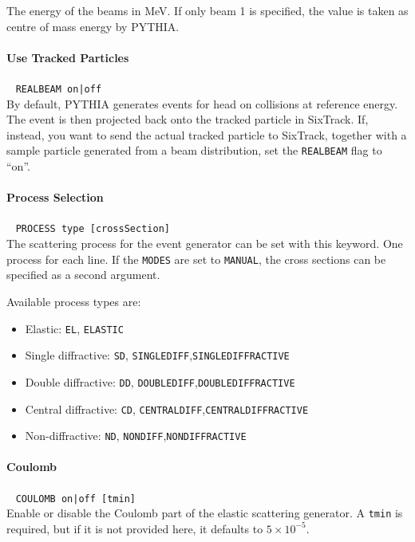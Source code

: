 The energy of the beams in MeV.
If only beam 1 is specified, the value is taken as centre of mass energy by PYTHIA.

\paragraph{Use Tracked Particles}~ \texttt{REALBEAM on|off}\\

By default, PYTHIA generates events for head on collisions at reference energy.
The event is then projected back onto the tracked particle in SixTrack.
If, instead, you want to send the actual tracked particle to SixTrack, together with a sample particle generated from a beam distribution, set the \texttt{REALBEAM} flag to ``on''.

\paragraph{Process Selection}~ \texttt{PROCESS type [crossSection]}\\

The scattering process for the event generator can be set with this keyword.
One process for each line.
If the \texttt{MODES} are set to \texttt{MANUAL}, the cross sections can be specified as a second argument.

\bigskip
\noindent Available process types are:
\begin{itemize}
  \item Elastic: \texttt{EL}, \texttt{ELASTIC}
  \item Single diffractive: \texttt{SD}, \texttt{SINGLEDIFF},\texttt{SINGLEDIFFRACTIVE}
  \item Double diffractive: \texttt{DD}, \texttt{DOUBLEDIFF},\texttt{DOUBLEDIFFRACTIVE}
  \item Central diffractive: \texttt{CD}, \texttt{CENTRALDIFF},\texttt{CENTRALDIFFRACTIVE}
  \item Non-diffractive: \texttt{ND}, \texttt{NONDIFF},\texttt{NONDIFFRACTIVE}
\end{itemize}

\paragraph{Coulomb}~ \texttt{COULOMB on|off [tmin]}\\

Enable or disable the Coulomb part of the elastic scattering generator.
A \texttt{tmin} is required, but if it is not provided here, it defaults to $5\times 10^{-5}$.

